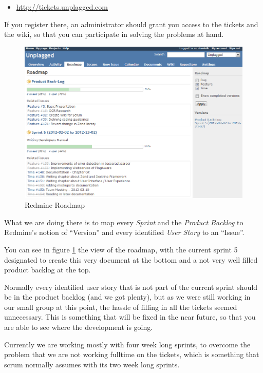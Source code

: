\begin{itemize}
\item \url{http://tickets.unplagged.com}
\end{itemize}

If you register there, an administrator should grant you access to the tickets and the wiki, so that you can participate
in solving the problems at hand.

\begin{figure}[htbp]
  \centering
    \includegraphics[width=\textwidth]{images/roadmap.png}
  \caption{Redmine Roadmap}
  \label{fig:roadmap}
\end{figure}

What we are doing there is to map every \textit{Sprint} and the \textit{Product Backlog} to Redmine's notion of \enquote{Version} and
every identified \textit{User Story} to an \enquote{Issue}.

You can see in figure \ref{fig:roadmap} the view of the roadmap, with the current sprint 5 designated to create this very
document at the bottom and a not very well filled product backlog at the top. 

Normally 
every identified user story that is not part of the current sprint should be in the product backlog (and we got plenty), 
but as we were still working
in our small group at this point, the hassle of filling in all the tickets seemed unnecessary. This is something that
will be fixed in the near future, so that you are able to see where the development is going.

Currently we are working mostly with four week long sprints, to overcome the problem that we are not working fulltime
on the tickets, which is something that scrum normally assumes with its two week long sprints.

